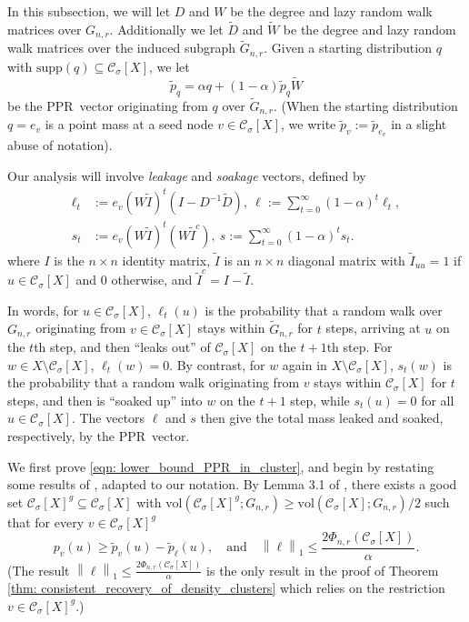 \documentclass[11pt,twoside]{article}
\newcommand{\vol}{\mathrm{vol}}
\newcommand{\norm}[1]{\left\lVert#1\right\rVert}
\newcommand{\1}{\mathbf{1}}
\newcommand{\pbf}{p}        %
\newcommand{\Xbf}{X}             %
\newcommand{\Wbf}{W}
\newcommand{\Dbf}{D}
\newcommand{\Cset}{\mathcal{C}}
\newcommand{\Csig}{\Cset_{\sigma}}
\newcommand{\pprspace}{{\sc PPR~}}
\newcommand{\wDbf}{\widetilde{\Dbf}}
\begin{document}
In this subsection, we will let $\Dbf$ and $\Wbf$ be the degree and lazy random walk matrices over $G_{n,r}$. Additionally we let $\widetilde{\Dbf}$ and $\widetilde{\Wbf}$ be the degree and lazy random walk matrices over the induced subgraph $\widetilde{G}_{n,r}$. Given a starting distribution $q$ with $\mathrm{supp}(q) \subseteq \Csig[\Xbf]$, we let
	\begin{equation}
	\widetilde{\pbf}_q = \alpha q + (1 - \alpha) \widetilde{\pbf}_{q} \widetilde{\Wbf}
	\end{equation}
	be the \pprspace vector originating from $q$ over $\widetilde{G}_{n,r}$. (When the starting distribution $q = e_v$ is a point mass at a seed node $v \in \Csig[\Xbf]$, we write $\widetilde{\pbf}_v := \widetilde{\pbf}_{e_v}$ in a slight abuse of notation).
	
	Our analysis will involve \emph{leakage} and \emph{soakage} vectors, defined by
	\begin{align}
	\label{eqn: leakage_soakage}
	\ell_t & := e_v (\Wbf \widetilde{I} )^t (I - \Dbf^{-1} \wDbf),~ \ell := \sum_{t = 0}^{\infty} (1 - \alpha)^t \ell_t, \nonumber \\
	s_t & := e_v (\Wbf \widetilde{I} )^t (\Wbf \widetilde{I}^c),~ s := \sum_{t = 0}^{\infty} (1 - \alpha)^{t} s_t.
	\end{align}
	where $I$ is the $n \times n$ identity matrix, $\widetilde{I}$ is an $n \times n$ diagonal matrix with $\widetilde{I}_{uu} = 1$ if $u \in \Csig[\Xbf]$ and $0$ otherwise, and $\widetilde{I}^c = I - \widetilde{I}$.
	
	In words, for $u \in \Csig[\Xbf]$, $\ell_t(u)$ is the probability that a random walk over $G_{n,r}$ originating from $v \in \Csig[\Xbf]$ stays within $\widetilde{G}_{n,r}$ for $t$ steps, arriving at $u$ on the $t$th step, and then ``leaks out'' of $\Csig[\Xbf]$ on the $t + 1$th step. For $w \in \Xbf \setminus \Csig[\Xbf]$, $\ell_t(w) = 0$. By contrast, for $w$ again in $\Xbf \setminus \Csig[\Xbf]$, $s_t(w)$ is the probability that a random walk originating from $v$ stays within $\Csig[\Xbf]$ for $t$ steps, and then is ``soaked up'' into $w$ on the $t + 1$ step, while $s_t(u) = 0$ for all $u \in \Csig[\Xbf]$. The vectors $\ell$ and $s$ then give the total mass leaked and soaked, respectively, by the \pprspace vector. 
	
	We first prove \eqref{eqn: lower_bound_PPR_in_cluster}, and begin by restating some results of \citep{zhu2013}, adapted to our notation. By Lemma 3.1 of \citep{zhu2013}, there exists a good set $\Csig[\Xbf]^g \subseteq \Csig[\Xbf]$ with $\vol(\Csig[\Xbf]^g; G_{n,r}) \geq \vol(\Csig[\Xbf]; G_{n,r})/2$ such that for every $v \in \Csig[\Xbf]^g$
	\begin{equation}
	\label{eqn: zhulemma3.1}
	\pbf_v(u) \geq \widetilde{\pbf}_v(u) - \widetilde{\pbf}_{\ell}(u), \quad \textrm{and} \quad \norm{\ell}_1 \leq \frac{2 \Phi_{n,r}(\Csig[\Xbf])}{\alpha}.
	\end{equation}
	(The result $\norm{\ell}_1 \leq \frac{2 \Phi_{n,r}(\Csig[\Xbf])}{\alpha}$ is the only result in the proof of Theorem \ref{thm: consistent_recovery_of_density_clusters} which relies on the restriction $v \in \Csig[\Xbf]^g$.)
	
\end{document}
